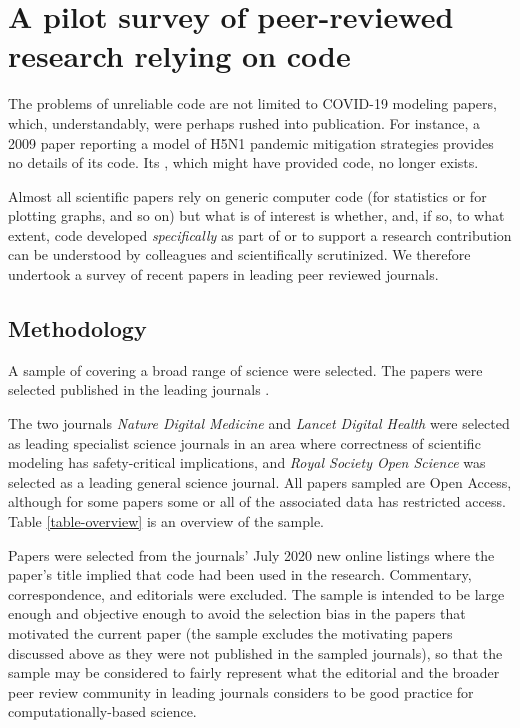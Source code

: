 \section{A pilot survey of peer-reviewed research relying on code}
\label{survey-section}
The problems of unreliable code are not limited to COVID-19 modeling papers, which, understandably, were perhaps rushed into publication. For instance, a 2009 paper reporting a model of H5N1 pandemic mitigation strategies \cite{flu-model} provides no details of its code. Its \supplement, which might have provided code, no longer exists.

Almost all scientific papers rely on generic computer code (for statistics or for plotting graphs, and so on) but what is of interest is whether, and, if so, to what extent, code developed \emph{specifically\/} as part of or to support a research contribution can be understood by colleagues and scientifically scrutinized. We therefore undertook a survey of recent papers in leading peer reviewed journals.

\subsection{Methodology}
A sample of  covering a broad range of science were selected. The papers were selected published in the leading journals \journalBreakdown. 

The two journals \emph{Nature Digital Medicine\/} and \emph{Lancet Digital Health\/} were selected as leading specialist science journals in an area where correctness of scientific modeling has safety-critical implications, and \emph{Royal Society Open Science\/} was selected as a leading general science journal. All papers sampled are Open Access, although for some papers some or all of the associated data has restricted access. Table \ref{table-overview} is an overview of the sample. 

Papers were selected from the journals' July 2020 new online listings where the paper's title implied that code had been used in the research. Commentary, correspondence, and editorials were excluded. The sample is intended to be large enough and objective enough to avoid the selection bias in the papers that motivated the current paper (the sample excludes the motivating papers discussed above as they were not published in the sampled journals), so that the sample may be considered to fairly represent what the editorial and the broader peer review community in leading journals considers to be good practice for computationally-based science. 

